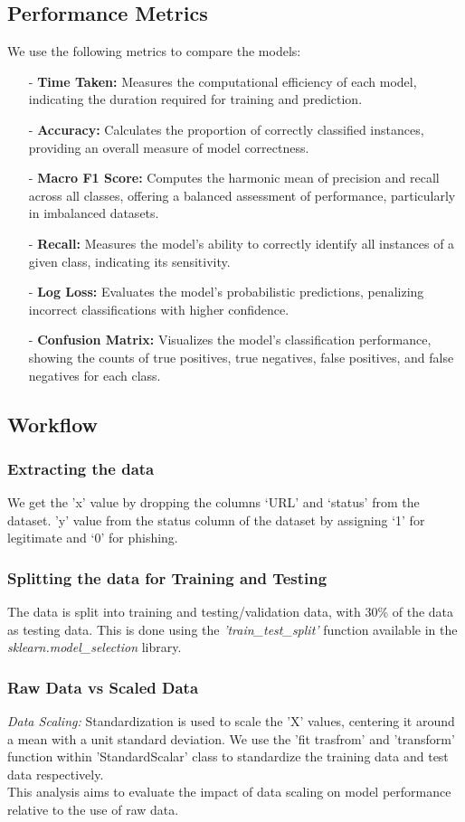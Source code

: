 \subsection{Performance Metrics}
We use the following metrics to compare the models:
\begin{itemize}
    \item[-] \textbf{Time Taken:} Measures the computational efficiency of each model, indicating the duration required for training and prediction.
    \item[-] \textbf{Accuracy:} Calculates the proportion of correctly classified instances, providing an overall measure of model correctness.
    \item[-] \textbf{Macro F1 Score:} Computes the harmonic mean of precision and recall across all classes, offering a balanced assessment of performance, particularly in imbalanced datasets.
    \item[-] \textbf{Recall:} Measures the model's ability to correctly identify all instances of a given class, indicating its sensitivity.
    \item[-] \textbf{Log Loss:} Evaluates the model's probabilistic predictions, penalizing incorrect classifications with higher confidence.
    \item[-] \textbf{Confusion Matrix:} Visualizes the model's classification performance, showing the counts of true positives, true negatives, false positives, and false negatives for each class.
\end{itemize}
\subsection{Workflow}
\subsubsection{Extracting the data}
We get the ’x’ value by dropping the columns ‘URL’ and ‘status’ from the dataset. ’y’ value from the status column of the dataset by assigning ‘1’ for legitimate and ‘0’ for phishing.
\subsubsection{Splitting the data for Training and  Testing}
The data is split into training and testing/validation data, with 30\% of the data as testing data. This is done using the \textit{'train\_test\_split'} function available in the \textit{sklearn.model\_selection} library.
\subsubsection{Raw Data vs Scaled Data}
\textit{Data Scaling:} Standardization is used to scale the ’X’ values, centering it around a mean with a unit standard deviation. We use the ’fit trasfrom’ and ’transform’ function within ’StandardScalar’ class to standardize the training data and test data respectively.\\
This analysis aims to evaluate the impact of data scaling on model performance relative to the use of raw data.

